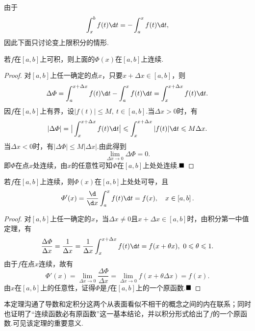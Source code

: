 由于
$$\int_{x}^{b}f(t)\d t=-\int_{a}^{x}f(t)\d t,$$
因此下面只讨论变上限积分的情形.
\begin{theorem}
	若$f$在$\left[a,b\right]$上可积，则上面的$\varPhi(x)$在$\left[a,b\right]$上连续.
\end{theorem}
\begin{proof}
	对$\left[a,b\right]$上任一确定的点$x$，只要$x+\Delta x\in\left[a,b\right]$，则
	$$\Delta \varPhi=\int_{a}^{x+\Delta x}f(t)\d t-\int_{a}^{x}f(t)\d t=\int_{x}^{x+\Delta x}f(t)\d t.$$
	因$f$在$\left[a,b\right]$上有界，设$|f(t)|\leqslant M,\ t\in\left[a,b\right]$.当$\Delta x>0$时，有
	$$|\Delta\varPhi|=\big|\int_{x}^{x+\Delta x}f(t)\d t\big|\leqslant\int_{x}^{x+\Delta x}|f(t)|\d t\leqslant M\Delta x.$$
	当$\Delta x<0$时，有$|\Delta \varPhi|\leqslant M|\Delta x|$.由此得到
	$$\lim\limits_{\Delta x\to 0}\Delta \varPhi=0.$$
	即$\varPhi$在点$x$处连续，由$x$的任意性可知$\varPhi$在$\left[a,b\right]$上处处连续.$\hfill\blacksquare$
\end{proof}
\begin{theorem}[微积分学基本定理]
	若$f$在$\left[a,b\right]$上连续，则$\varPhi(x)$在$\left[a,b\right]$上处处可导，且
	$$\varPhi'(x)=\frac{\d}{\d x}\int_{a}^{x}f(t)\d t=f(x),\quad x\in\left[a,b\right].$$
\end{theorem}
\begin{proof}
	对$\left[a,b\right]$上任一确定的$x$，当$\Delta x\neq 0$且$x+\Delta x\in\left[a,b\right]$时，由积分第一中值定理，有
	$$\frac{\Delta\varPhi}{\Delta x}=\frac{1}{\Delta x}=\frac{1}{\Delta x}\int_{x}^{x+\Delta x}f(t)\d t=f(x+\theta x),\ 0\leqslant\theta\leqslant 1.$$
	由于$f$在点$x$连续，故有
	$$\varPhi'(x)=\lim\limits_{\Delta x\to 0}\frac{\Delta \varPhi}{\Delta x}=\lim\limits_{\Delta x\to 0}f(x+\theta\Delta x)=f(x).$$
	由$x$在$\left[a,b\right]$上的任意性，证得$\varPhi$是$f$在$\left[a,b\right]$上的一个原函数.$\hfill\blacksquare$
\end{proof}
\begin{remark}
	本定理沟通了导数和定积分这两个从表面看似不相干的概念之间的内在联系；同时也证明了“连续函数必有原函数”这一基本结论，并以积分形式给出了$f$的一个原函数.可见该定理的重要意义.
\end{remark}

